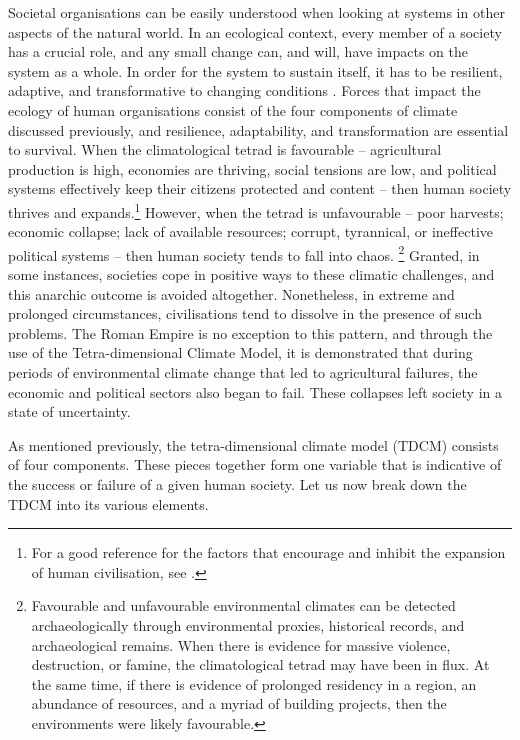 	Societal organisations can be easily understood when looking at systems in other aspects of the natural world. In an ecological context, every member of a society has a crucial role, and any small change can, and will, have impacts on the system as a whole. In order for the system to sustain itself, it has to be resilient, adaptive, and transformative to changing conditions \parencite{Walker_2004}. Forces that impact the ecology of human organisations consist of the four components of climate discussed previously, and resilience, adaptability, and transformation are essential to survival. When the climatological tetrad is favourable – agricultural production is high, economies are thriving, social tensions are low, and political systems effectively keep their citizens protected and content – then human society thrives and expands.\footnote{For a good reference for the factors that encourage and inhibit the expansion of human civilisation, see \textcite{Diamond_1997}.} 
However, when the tetrad is unfavourable – poor harvests; economic collapse; lack of available resources; corrupt, tyrannical, or ineffective political systems – then human society tends to fall into chaos. \footnote{Favourable and unfavourable environmental climates can be detected archaeologically through environmental proxies, historical records, and archaeological remains. When there is evidence for massive violence, destruction, or famine, the climatological tetrad may have been in flux. At the same time, if there is evidence of prolonged residency in a region, an abundance of resources, and a myriad of building projects, then the environments were likely favourable.} Granted, in some instances, societies cope in positive ways to these climatic challenges, and this anarchic outcome is avoided altogether. Nonetheless, in extreme and prolonged circumstances, civilisations tend to dissolve in the presence of such problems. 
The Roman Empire is no exception to this pattern, and through the use of the Tetra-dimensional Climate Model, it is demonstrated that during periods of environmental climate change that led to agricultural failures, the economic and political sectors also began to fail. These collapses left society in a state of uncertainty. 

As mentioned previously, the tetra-dimensional climate model (TDCM) consists of four components. These pieces together form one variable that is indicative of the success or failure of a given human society. Let us now break down the TDCM into its various elements.

